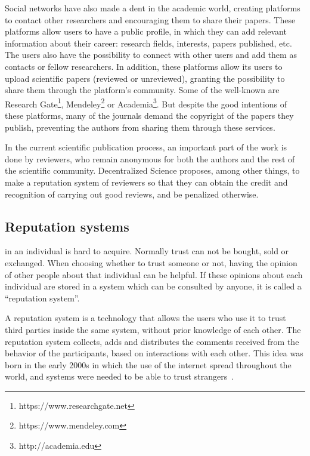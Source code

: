 Social networks have also made a dent in the academic world, creating platforms
to contact other researchers and encouraging them to share their papers. These
platforms allow users to have a public profile, in which they can add relevant
information about their career: research fields, interests, papers published,
etc. The users also have the possibility to connect with other users and add
them as contacts or fellow researchers. In addition, these platforms allow its
users to upload scientific papers (reviewed or unreviewed), granting the
possibility to share them through the platform's community. Some of the
well-known are Research Gate\footnote{https://www.researchgate.net},
Mendeley\footnote{https://www.mendeley.com} or
Academia\footnote{http://academia.edu}. But despite the good intentions of these
platforms, many of the journals demand the copyright of the papers they publish,
preventing the authors from sharing them through these services.

In the current scientific publication process, an important part of the work is
done by reviewers, who remain anonymous for both the authors and the rest of the
scientific community. Decentralized Science proposes, among other things, to
make a reputation system of reviewers so that they can obtain the credit and
recognition of carrying out good reviews, and be penalized otherwise.

\subsection{Reputation systems}
\label{scb:rs}

 in an individual is hard to acquire. Normally trust can not be
bought, sold or exchanged. When choosing whether to trust someone or not, having
the opinion of other people about that individual can be helpful. If these
opinions about each individual are stored in a system which can be consulted by
anyone, it is called a ``reputation system''.

A reputation system is a technology that allows the users who use it to trust
third parties inside the same system, without prior knowledge of each other. The
reputation system collects, adds and distributes the comments received from the
behavior of the participants, based on interactions with each other. This idea
was born in the early 2000s in which the use of the internet spread throughout
the world, and systems were needed to be able to trust
strangers~\cite{resnick2000reputation}.

